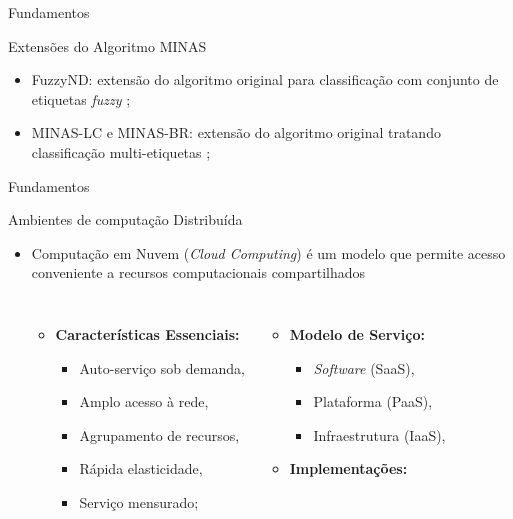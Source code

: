 \documentclass[aspectratio=43,10pt]{beamer}
\begin{document}
\begin{frame}[fragile]{Fundamentos}
  \begin{alertblock}{Extensões do Algoritmo MINAS}
    \begin{itemize}
      \item FuzzyND: extensão do algoritmo original para classificação com
      conjunto de etiquetas \emph{fuzzy} \cite{DaSilva2018,DaSilva2018thesis};
      \item MINAS-LC e MINAS-BR: extensão do algoritmo original tratando
      classificação multi-etiquetas \cite{Costa2019,Costa2019thesis};
    \end{itemize}
  \end{alertblock}
\end{frame}

\begin{frame}[fragile]{Fundamentos}
\begin{alertblock}{Ambientes de computação Distribuída}
\begin{itemize}
  \item Computação em Nuvem (\emph{Cloud Computing}) é um modelo que permite
  acesso conveniente a recursos computacionais compartilhados \cite{NIST2011}
  \begin{columns}[T,onlytextwidth]
    \begin{itemize}
      \item \textbf{Características Essenciais:}
      \begin{itemize}
        \item Auto-serviço sob demanda,
        \item Amplo acesso à rede,
        \item Agrupamento de recursos,
        \item Rápida elasticidade,
        \item Serviço mensurado;
      \end{itemize}
    \end{itemize}
    \begin{itemize}
      \item \textbf{Modelo de Serviço:}
      \begin{itemize}
        \item \emph{Software} (SaaS),
        \item Plataforma (PaaS),
        \item Infraestrutura (IaaS),
      \end{itemize}
      \item \textbf{Implementações:}

\end{itemize}
\end{columns}
\end{itemize}
\end{alertblock}
\end{frame}
\end{document}
